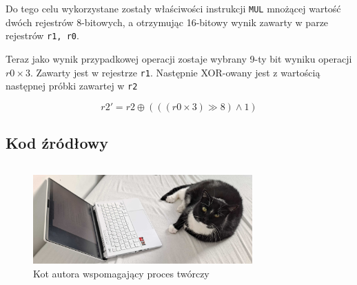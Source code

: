 \documentclass[12pt, a4paper]{article}
\begin{document}
Do tego celu wykorzystane zostały właściwości instrukcji \verb |MUL| mnożącej wartość dwóch rejestrów 8-bitowych,
a otrzymując 16-bitowy wynik zawarty w parze rejestrów \verb|r1, r0|.

Teraz jako wynik przypadkowej operacji zostaje wybrany 9-ty bit wyniku operacji $r0 \times 3$.
Zawarty jest w rejestrze \verb|r1|. Następnie XOR-owany jest z wartością następnej próbki zawartej w \verb|r2|

\begin{equation}
	r2' = r2 \oplus \left( \left( (r0 \times 3) \gg 8 \right) \land 1 \right)
\end{equation}
\fi

\subsection{Kod źródłowy}

\inputminted[linenos=true,escapeinside=@@,fontfamily=phv]{asm}{../src/main.S}

\newpage
\printbibliography %

\newpage

\begin{figure}
	\centering
	\includegraphics[width=0.75\textwidth]{img/kot_enter.jpg}
	\caption{Kot autora wspomagający proces twórczy}
\end{figure}
\end{document}
